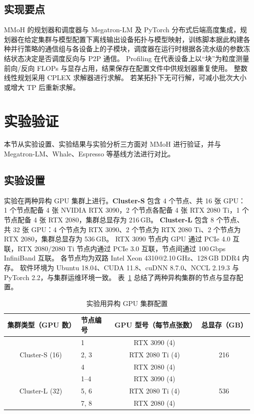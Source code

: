 \subsection{实现要点}

MMoH 的规划器和调度器与 Megatron-LM\cite{megatron2020} 及 PyTorch 分布式后端高度集成，规划器在给定集群与模型配置下离线输出设备拓扑与模型映射，训练脚本据此构建各种并行策略的通信组与各设备上的子模块，调度器在运行时根据各流水级的参数冻结状态决定是否调度反向与 P2P 通信。
Profiling 在代表设备上以“块”为粒度测量前向/反向 FLOPs 与显存占用，结果保存在配置文件中供规划器重复使用。
整数线性规划采用 CPLEX 求解器进行求解。
若某拓扑下无可行解，可减小批次大小或增大 TP 后重新求解。

\section{实验验证}

本节从实验设置、实验结果与实验分析三方面对 MMoH 进行验证，并与 Megatron-LM、Whale、Espresso 等基线方法进行对比。

\subsection{实验设置}

实验在两种异构 GPU 集群上进行。\textbf{Cluster-S} 包含 4 个节点、共 16 张 GPU：
1 个节点配备 4 张 NVIDIA RTX 3090，2 个节点各配备 4 张 RTX 2080 Ti，1 个节点配备 4 张 RTX 2080，集群总显存为 216\,GB。
\textbf{Cluster-L} 包含 8 个节点、共 32 张 GPU：4 个节点为 RTX 3090、2 个节点为 RTX 2080 Ti、2 个节点为 RTX 2080，集群总显存为 536\,GB。
RTX 3090 节点内 GPU 通过 PCIe 4.0 互联，RTX 2080/2080 Ti 节点内通过 PCIe 3.0 互联，节点间通过 100\,Gbps InfiniBand 互联。
各节点均为双路 Intel Xeon 4310@2.10\,GHz、128\,GB DDR4 内存。
软件环境为 Ubuntu 18.04、CUDA 11.8、cuDNN 8.7.0、NCCL 2.19.3 与 PyTorch 2.2，与集群运维环境一致。
表~\ref{tab:chap3-cluster} 总结了两种异构集群的节点与显存配置。

\begin{table}[htbp]
  \centering
  \caption{实验用异构 GPU 集群配置}
  \label{tab:chap3-cluster}
  \begin{tabular}{clcc}
    \toprule
    \textbf{集群类型（GPU 数）} & \textbf{节点编号} & \textbf{GPU 型号（每节点张数）} & \textbf{总显存（GB）} \\
    \midrule
    \multirow{3}{*}{Cluster-S (16)} & 1 & RTX 3090 (4) & \multirow{3}{*}{216} \\
    & 2, 3 & RTX 2080 Ti (4) & \\
    & 4 & RTX 2080 (4) & \\
    \midrule
    \multirow{3}{*}{Cluster-L (32)} & 1--4 & RTX 3090 (4) & \multirow{3}{*}{536} \\
    & 5, 6 & RTX 2080 Ti (4) & \\
    & 7, 8 & RTX 2080 (4) & \\
    \bottomrule
  \end{tabular}
\end{table}

